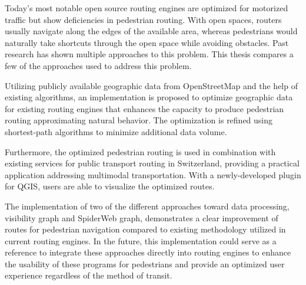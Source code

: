 Today's most notable open source routing engines are optimized for motorized traffic but show deficiencies in pedestrian routing. With open spaces, routers usually navigate along the edges of the available area, whereas pedestrians would naturally take shortcuts through the open space while avoiding obstacles.
Past research has shown multiple approaches to this problem. This thesis compares a few of the approaches used to address this problem.

Utilizing publicly available geographic data from OpenStreetMap and the help of existing algorithms, an implementation is proposed to optimize geographic data for existing routing engines that enhances the capacity to produce pedestrian routing approximating natural behavior. The optimization is refined using shortest-path algorithms to minimize additional data volume.

Furthermore, the optimized pedestrian routing is used in combination with existing services for public transport routing in Switzerland, providing a practical application addressing multimodal transportation. With a newly-developed plugin for QGIS, users are able to visualize the optimized routes.

The implementation of two of the different approaches toward data processing, visibility graph and SpiderWeb graph, demonstrates a clear improvement of routes for pedestrian navigation compared to existing methodology utilized in current routing engines. In the future, this implementation could serve as a reference to integrate these approaches directly into routing engines to enhance the usability of these programs for pedestrians and provide an optimized user experience regardless of the method of transit.